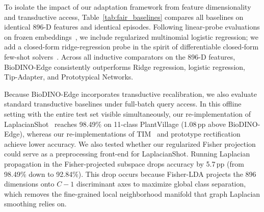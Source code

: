 To isolate the impact of our adaptation framework from feature dimensionality and transductive access, Table~\ref{tab:fair_baselines} compares all baselines on identical 896-D features and identical episodes. Following linear-probe evaluations on frozen embeddings~\cite{tian2020rethinking}, we include regularized multinomial logistic regression; we add a closed-form ridge-regression probe in the spirit of differentiable closed-form few-shot solvers~\cite{bertinetto2019r2d2}. Across all inductive comparators on the 896-D features, BioDINO-Edge consistently outperforms Ridge regression, logistic regression, Tip-Adapter, and Prototypical Networks.

Because BioDINO-Edge incorporates transductive recalibration, we also evaluate standard transductive baselines under full-batch query access. In this offline setting with the entire test set visible simultaneously, our re-implementation of LaplacianShot~\cite{ziko2020laplacian} reaches 98.49\% on 11-class PlantVillage (1.08\,pp above BioDINO-Edge), whereas our re-implementations of TIM~\cite{boudiaf2020transductive} and prototype rectification~\cite{liu2020bdcspn} achieve lower accuracy. We also tested whether our regularized Fisher projection could serve as a preprocessing front-end for LaplacianShot. Running Laplacian propagation in the Fisher-projected subspace drops accuracy by 5.7\,pp (from 98.49\% down to 92.84\%). This drop occurs because Fisher-LDA projects the 896 dimensions onto $C-1$ discriminant axes to maximize global class separation, which removes the fine-grained local neighborhood manifold that graph Laplacian smoothing relies on.

